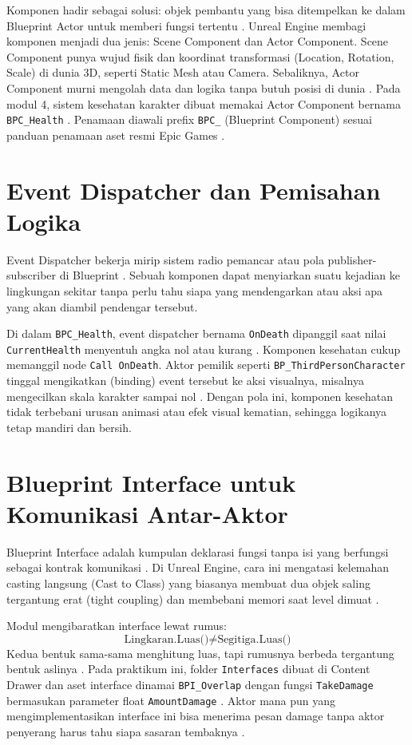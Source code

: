 \documentclass[a4paper,oneside,12pt]{report}
\begin{document}
Komponen hadir sebagai solusi: objek pembantu yang bisa ditempelkan ke dalam Blueprint Actor untuk memberi fungsi tertentu \cite{modul4}. Unreal Engine membagi komponen menjadi dua jenis: Scene Component dan Actor Component. Scene Component punya wujud fisik dan koordinat transformasi (Location, Rotation, Scale) di dunia 3D, seperti Static Mesh atau Camera. Sebaliknya, Actor Component murni mengolah data dan logika tanpa butuh posisi di dunia \cite{epic-components}. Pada modul 4, sistem kesehatan karakter dibuat memakai Actor Component bernama \texttt{BPC\_Health} \cite{modul4}. Penamaan diawali prefix \texttt{BPC\_} (Blueprint Component) sesuai panduan penamaan aset resmi Epic Games \cite{epic-naming}.

\section{Event Dispatcher dan Pemisahan Logika}
Event Dispatcher bekerja mirip sistem radio pemancar atau pola publisher-subscriber di Blueprint \cite{epic-dispatchers}. Sebuah komponen dapat menyiarkan suatu kejadian ke lingkungan sekitar tanpa perlu tahu siapa yang mendengarkan atau aksi apa yang akan diambil pendengar tersebut.

Di dalam \texttt{BPC\_Health}, event dispatcher bernama \texttt{OnDeath} dipanggil saat nilai \texttt{CurrentHealth} menyentuh angka nol atau kurang \cite{modul4}. Komponen kesehatan cukup memanggil node \texttt{Call OnDeath}. Aktor pemilik seperti \texttt{BP\_ThirdPersonCharacter} tinggal mengikatkan (binding) event tersebut ke aksi visualnya, misalnya mengecilkan skala karakter sampai nol \cite{modul4}. Dengan pola ini, komponen kesehatan tidak terbebani urusan animasi atau efek visual kematian, sehingga logikanya tetap mandiri dan bersih.

\section{Blueprint Interface untuk Komunikasi Antar-Aktor}
Blueprint Interface adalah kumpulan deklarasi fungsi tanpa isi yang berfungsi sebagai kontrak komunikasi \cite{epic-interface}. Di Unreal Engine, cara ini mengatasi kelemahan casting langsung (Cast to Class) yang biasanya membuat dua objek saling tergantung erat (tight coupling) dan membebani memori saat level dimuat \cite{modul4,yt-tutorial}.

Modul mengibaratkan interface lewat rumus:
\begin{equation}
\text{Lingkaran.Luas()} \neq \text{Segitiga.Luas()}
\end{equation}
Kedua bentuk sama-sama menghitung luas, tapi rumusnya berbeda tergantung bentuk aslinya \cite{modul4}. Pada praktikum ini, folder \texttt{Interfaces} dibuat di Content Drawer dan aset interface dinamai \texttt{BPI\_Overlap} dengan fungsi \texttt{TakeDamage} bermasukan parameter float \texttt{AmountDamage} \cite{modul4}. Aktor mana pun yang mengimplementasikan interface ini bisa menerima pesan damage tanpa aktor penyerang harus tahu siapa sasaran tembaknya \cite{epic-interface}.
\end{document}
